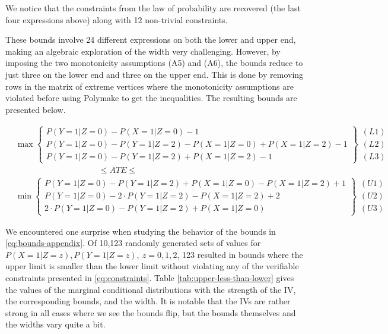 \documentclass[
]{article}
\theoremstyle{plain}
\begin{document}
We notice that the constraints from the law of probability are recovered (the last four expressions above) along with 12 non-trivial constraints.

These bounds involve 24 different expressions on both the lower and upper end, making an algebraic exploration of the width very challenging. However, by imposing the two monotonicity assumptions (A5) and (A6), the bounds reduce to just three on the lower end and three on the upper end. This is done by removing rows in the matrix of extreme vertices where the monotonicity assumptions are violated before using Polymake to get the inequalities. The resulting bounds are presented below.

\[
  \begin{aligned}
    &\max
      \begin{Bmatrix}
        P(Y = 1 | Z = 0) - P(X = 1 | Z = 0) - 1 \\
        P(Y = 1 | Z = 0) - P(Y = 1 | Z = 2) - P(X = 1 | Z = 0) + P(X = 1 | Z = 2) - 1 \\
        P(Y = 1 | Z = 0) - P(Y = 1 | Z = 2) + P(X = 1 | Z = 2) - 1
      \end{Bmatrix} 
      \begin{matrix} (L1) \\ (L2) \\ (L3) \end{matrix}  \\
    &\qquad \qquad \qquad \qquad \qquad\le ATE \le \\
    &\min
      \begin{Bmatrix}
        P(Y = 1 | Z = 0) - P(Y = 1 | Z = 2) + P(X = 1 | Z = 0) - P(X = 1 | Z = 2) + 1\\
        P(Y = 1 | Z = 0) - 2\cdot P(Y = 1 | Z = 2) - P(X = 1 | Z = 2) + 2 \\
        2\cdot P(Y = 1 | Z = 0) - P(Y = 1 | Z = 2) + P(X = 1 | Z = 0)
      \end{Bmatrix}
      \begin{matrix} (U1) \\ (U2) \\ (U3) \end{matrix}
  \end{aligned}
\]

We encountered one surprise when studying the behavior of the bounds in \eqref{eq:bounds-appendix}. Of 10,123 randomly generated sets of values for \(P(X = 1 | Z = z), P(Y = 1 | Z = z),\ z = 0,1,2\), 123 resulted in bounds where the upper limit is smaller than the lower limit without violating any of the verifiable constraints presented in \eqref{eq:constraints}. Table \ref{tab:upper-less-than-lower} gives the values of the marginal conditional distributions with the strength of the IV, the corresponding bounds, and the width. It is notable that the IVs are rather strong in all cases where we see the bounds flip, but the bounds themselves and the widths vary quite a bit.
\end{document}
